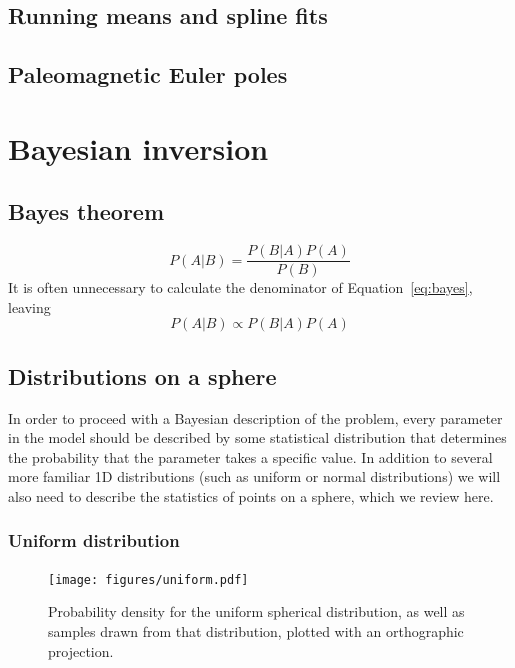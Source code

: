 \documentclass[preprint,12pt,authoryear]{elsarticle}
\begin{document}
\subsection{Running means and spline fits}
\subsection{Paleomagnetic Euler poles}
\citet{gordon1984paleomagnetic}

\section{Bayesian inversion}
\label{sec:bayesian_inversion}
\subsection{Bayes theorem}

\begin{equation}
P\left(A \vert B \right) = \frac{ P \left(B \vert A \right) P \left(A\right) }{P \left(B\right)}
\label{eq:bayes}
\end{equation}
It is often unnecessary to calculate the denominator of Equation~\eqref{eq:bayes}, leaving
\begin{equation}
P\left(A \vert B \right) \propto P \left(B \vert A \right) P \left(A\right) 
\label{eq:propbayes}
\end{equation}
\subsection{Distributions on a sphere}

In order to proceed with a Bayesian description of the problem, every parameter
in the model should be described by some statistical distribution that determines
the probability that the parameter takes a specific value.
In addition to several more familiar 1D distributions (such as uniform or normal distributions)
we will also need to describe the statistics of points on a sphere, which we 
review here.


\subsubsection{Uniform distribution}
\begin{figure}
\texttt{[image: figures/uniform.pdf]}
\caption{Probability density for the uniform spherical distribution, as well as samples drawn from that distribution, plotted with an orthographic projection.}
\label{fig:uniform}
\end{figure}
\end{document}
